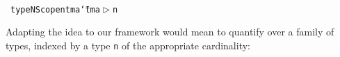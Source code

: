 \documentclass[9pt,preprint,authoryear]{sigplanconf}
\begin{document}
%
%
%
~\\~\vphantom{$\{$}\textcolor[cmyk]{0,0.65,0.99,0}{\texttt{type}}\textcolor[rgb]{0,0,0.80}{\texttt{\mbox{\hspace{0.50em}}}}\textcolor[rgb]{0,0,0.80}{\texttt{NScope}}\textcolor[rgb]{0,0,0.80}{\texttt{\mbox{\hspace{0.50em}}}}\textcolor[rgb]{0,0,0.80}{\texttt{n}}\textcolor[rgb]{0,0,0.80}{\texttt{\mbox{\hspace{0.50em}}}}\textcolor[rgb]{0,0,0.80}{\texttt{tm}}\textcolor[rgb]{0,0,0.80}{\texttt{\mbox{\hspace{0.50em}}}}\textcolor[rgb]{0,0,0.80}{\texttt{a}}\textcolor[rgb]{0,0,0.80}{\texttt{\mbox{\hspace{0.50em}}}}\textcolor[cmyk]{0,0.65,0.99,0}{\texttt{{\char `\=}}}\textcolor[rgb]{0,0,0.80}{\texttt{\mbox{\hspace{0.50em}}}}\textcolor[rgb]{0,0,0.80}{\texttt{tm}}\textcolor[rgb]{0,0,0.80}{\texttt{\mbox{\hspace{0.50em}}}}\textcolor[cmyk]{0,0.65,0.99,0}{\texttt{\makebox[1.22ex][l]{$ {(} $}}}\textcolor[rgb]{0,0,0.80}{\texttt{a}}\textcolor[rgb]{0,0,0.80}{\texttt{\mbox{\hspace{0.50em}}}}\textcolor[rgb]{0,0,0.80}{\texttt{$ \vartriangleright $}}\textcolor[rgb]{0,0,0.80}{\texttt{\mbox{\hspace{0.50em}}}}\textcolor[rgb]{0,0,0.80}{\texttt{n}}\textcolor[cmyk]{0,0.65,0.99,0}{\texttt{\makebox[1.22ex][r]{$ {)} $}}}\textcolor[rgb]{0,0,0.80}{\texttt{{\nopagebreak \newline%
}\vphantom{$\{$}}}%


%
Adapting the idea to our framework would mean to quantify over a family of types,
    indexed by a type \textcolor[rgb]{0,0,0.80}{\texttt{n}} of the appropriate cardinality{:}%


%
%


{\nopagebreak }
\end{document}
